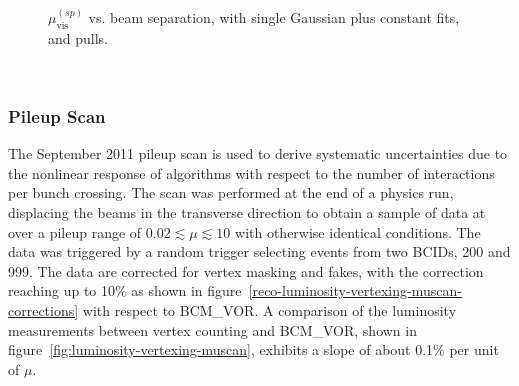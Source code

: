 \begin{figure}[htbp]
{		
	}\\
	\caption{$\mu_{\textrm{vis}}^{(sp)}$ vs. beam separation, with single Gaussian plus constant fits, and pulls.}
	\label{fig:luminosity-vertex-vdm}
\end{figure}

\ 

\subsubsection{Pileup Scan}

The September 2011 pileup scan is used to derive systematic uncertainties due to the nonlinear response of algorithms with respect to the number of interactions per bunch crossing. The scan was performed at the end of a physics run, displacing the beams in the transverse direction to obtain a sample of data at over a pileup range of $0.02\lesssim \mu \lesssim 10$ with otherwise identical conditions. The data was triggered by a random trigger selecting events from two BCIDs, 200 and 999. The data are corrected for vertex masking and fakes, with the correction reaching up to 10\% as shown in figure~\ref{reco-luminosity-vertexing-muscan-corrections} with respect to BCM\_VOR. A comparison of the luminosity measurements between vertex counting and BCM\_VOR, shown in figure~\ref{fig:luminosity-vertexing-muscan}, exhibits a slope of about 0.1\% per unit of $\mu$. 

